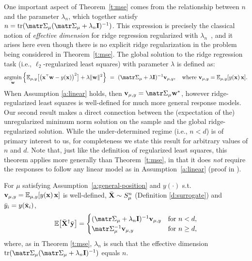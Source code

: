 \documentclass[../../thesis.tex]{subfiles}
\begin{document}
One important aspect of Theorem~\ref{t:mse} comes from the relationship between $n$ and the parameter $\lambda_n$, which together satisfy $n=\tr(\Sigmab_\mu (\Sigmab_\mu+\lambda_n\I)^{-1})$.
This expression is precisely the classical notion of \emph{effective
  dimension} for ridge regression regularized with
$\lambda_n$~\citep{ridge-leverage-scores}, and it arises here even though there is
no explicit ridge regularization in the problem being considered in
Theorem~\ref{t:mse}.
The global solution to the ridge regression task (i.e., $\ell_2$-regularized
least squares) with parameter $\lambda$ is defined as:
\begin{align*}
  \argmin_\w \Big\{\E_{\mu,y}\big[\big(\x^\top\w-y(\x)\big)^2\big]
  + \lambda\|\w\|^2\Big\}\ =\ (\Sigmab_\mu +
  \lambda\I)^{-1}\v_{\mu,y},\quad\text{where } \v_{\mu,y}=\E_{\mu,y}[y(\x)\,\x ].
\end{align*}
When Assumption \ref{a:linear} holds, then
$\v_{\mu,y}=\Sigmab_\mu\w^*$, however ridge-regularized least squares
is well-defined for much more general response models.
Our second result makes a direct connection between the (expectation
of the) unregularized minimum norm solution on the sample
and the global ridge-regularized solution.
While the under-determined regime (i.e., $n<d$) is of primary interest to us,
for completeness we state this result for arbitrary values of $n$ and $d$.
Note that, just like the definition of regularized least squares, this
theorem applies more generally than Theorem~\ref{t:mse}, in that it
does \emph{not} require the responses to follow any linear model as in
Assumption~\ref{a:linear} (proof in ).
\begin{theorem}
  \label{t:unbiased}
  For $\mu$ satisfying
  Assumption~\ref{a:general-position} and
  $y(\cdot)$ s.t.~$\mathbf v_{\mu,y}=\mathbb E_{\mu,y}[y(\mathbf x)\,\mathbf x]$ is well-defined,
  ${\bar{\mathbf X}}\sim S_\mu^n$ (Definition \ref{d:surrogate}) and ${\bar y}_i=y(\bar{\mathbf x}_i)$,
  \begin{align*}
    \E\big[\Xb^\dagger\ybb\big] =
    \begin{cases}
      (\Sigmab_\mu + \lambda_n\I)^{-1}\v_{\mu,y} & \text{for }n<d,     \\
      \Sigmab_\mu^{-1}\v_{\mu,y}                 & \text{for }n \ge d,
    \end{cases}
  \end{align*}
  where, as in Theorem \ref{t:mse}, $\lambda_n$ is such that the effective dimension
  $\tr(\Sigmab_\mu(\Sigmab_\mu+\lambda_n\I)^{-1})$ equals $n$.
\end{theorem}
\end{document}
